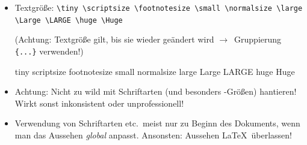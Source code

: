 \begin{frame}[<+->][fragile]
	\begin{itemize}
		\item Textgröße: \lstinline!\tiny \scriptsize \footnotesize \small \normalsize \large \Large \LARGE \huge \Huge!
		
		(Achtung: Textgröße gilt, bis sie wieder geändert wird $\rightarrow$~Gruppierung \lstinline!{...}! verwenden!)
		
		{\rmfamily
		\tiny tiny \scriptsize scriptsize \footnotesize footnotesize \small small \normalsize normalsize \large large \Large Large \LARGE LARGE \huge huge \Huge Huge}
		\item Achtung: Nicht zu wild mit Schriftarten (und besonders -Größen) hantieren! Wirkt sonst inkonsistent oder unprofessionell!
		\item Verwendung von Schriftarten etc.\ meist nur zu Beginn des Dokuments, wenn man das Aussehen \emph{global} anpasst. Ansonsten: Aussehen \LaTeX\ überlassen!
	\end{itemize}
\end{frame}

